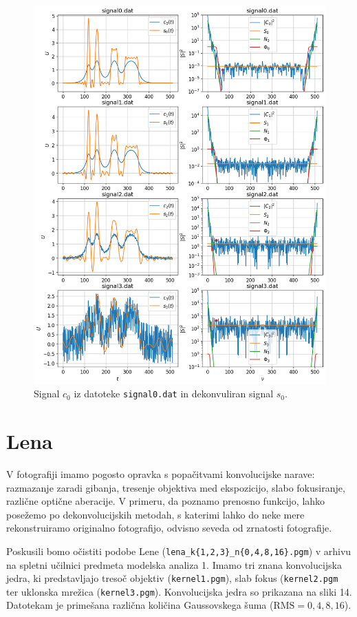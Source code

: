 \documentclass[slovene,11pt,a4paper]{article}
\begin{document}
\begin{figure}[h!]
\centering
\includegraphics[width=12cm]{slika13.png}
\caption{Signal $c_0 $ iz datoteke \texttt{signal0.dat} in dekonvuliran signal $s_0$.}
\end{figure}

\newpage

\section{Lena}

V fotografiji imamo pogosto opravka s popačitvami konvolucijske narave: razmazanje zaradi gibanja, tresenje objektiva med ekspozicijo, slabo fokusiranje, različne optične aberacije. V primeru, da poznamo prenosno funkcijo, lahko posežemo po dekonvolucijskih metodah, s katerimi lahko do neke mere rekonstruiramo originalno fotografijo, odvisno seveda od zrnatosti fotografije.

Poskusili bomo očistiti podobe Lene (\texttt{lena\_k\{1,2,3\}\_n\{0,4,8,16\}.pgm}) v arhivu na spletni učilnici predmeta modelska analiza 1. Imamo tri znana konvolucijska jedra, ki predstavljajo tresoč objektiv (\texttt{kernel1.pgm}), slab fokus (\texttt{kernel2.pgm} ter uklonska mrežica (\texttt{kernel3.pgm}). Konvolucijska jedra so prikazana na sliki 14. Datotekam je primešana različna količina Gaussovskega šuma ($\text{RMS} = 0, 4, 8, 16$).
\end{document}
